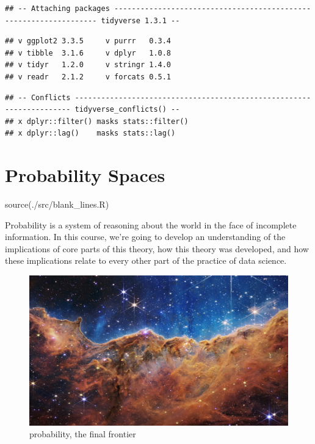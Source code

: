 \documentclass[
]{book}
\newenvironment{Shaded}{\begin{snugshade}}{\end{snugshade}}
\newcommand{\FunctionTok}[1]{\textcolor[rgb]{0.00,0.00,0.00}{#1}}
\newcommand{\NormalTok}[1]{#1}
\newcommand{\StringTok}[1]{\textcolor[rgb]{0.31,0.60,0.02}{#1}}
\theoremstyle{definition}
\theoremstyle{definition}
\theoremstyle{definition}
\theoremstyle{definition}
\theoremstyle{remark}
\begin{document}
\begin{verbatim}
## -- Attaching packages ------------------------------------------------------------------ tidyverse 1.3.1 --
\end{verbatim}

\begin{verbatim}
## v ggplot2 3.3.5     v purrr   0.3.4
## v tibble  3.1.6     v dplyr   1.0.8
## v tidyr   1.2.0     v stringr 1.4.0
## v readr   2.1.2     v forcats 0.5.1
\end{verbatim}

\begin{verbatim}
## -- Conflicts --------------------------------------------------------------------- tidyverse_conflicts() --
## x dplyr::filter() masks stats::filter()
## x dplyr::lag()    masks stats::lag()
\end{verbatim}

\hypertarget{probability-spaces}{%
\chapter{Probability Spaces}\label{probability-spaces}}

\begin{Shaded}
\begin{Highlighting}[]
\FunctionTok{source}\NormalTok{(}\StringTok{\textquotesingle{}./src/blank\_lines.R\textquotesingle{}}\NormalTok{)}
\end{Highlighting}
\end{Shaded}

Probability is a system of reasoning about the world in the face of incomplete information. In this course, we're going to develop an understanding of the implications of core parts of this theory, how this theory was developed, and how these implications relate to every other part of the practice of data science.

\begin{figure}
\centering
\includegraphics{./images/webb.jpg}
\caption{probability, the final frontier}
\end{figure}
\end{document}
